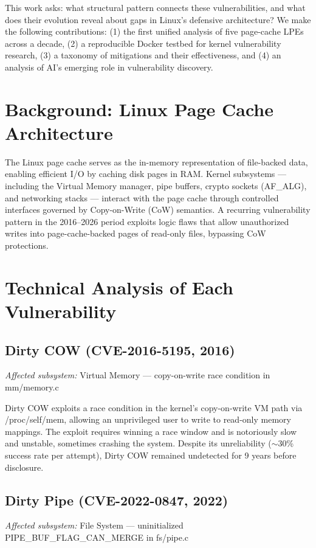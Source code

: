\documentclass[conference]{IEEEtran}
\begin{document}
This work asks: what structural pattern connects these vulnerabilities, and what does their evolution reveal about gaps in Linux's defensive architecture? We make the following contributions: (1) the first unified analysis of five page-cache LPEs across a decade, (2) a reproducible Docker testbed for kernel vulnerability research, (3) a taxonomy of mitigations and their effectiveness, and (4) an analysis of AI's emerging role in vulnerability discovery.

\section{Background: Linux Page Cache Architecture}
The Linux page cache serves as the in-memory representation of file-backed data, enabling efficient I/O by caching disk pages in RAM. Kernel subsystems --- including the Virtual Memory manager, pipe buffers, crypto sockets (AF\_ALG), and networking stacks --- interact with the page cache through controlled interfaces governed by Copy-on-Write (CoW) semantics. A recurring vulnerability pattern in the 2016--2026 period exploits logic flaws that allow unauthorized writes into page-cache-backed pages of read-only files, bypassing CoW protections.

\section{Technical Analysis of Each Vulnerability}

\subsection{Dirty COW (CVE-2016-5195, 2016)}
\textit{Affected subsystem:} Virtual Memory --- copy-on-write race condition in mm/memory.c

Dirty COW exploits a race condition in the kernel's copy-on-write VM path via /proc/self/mem, allowing an unprivileged user to write to read-only memory mappings. The exploit requires winning a race window and is notoriously slow and unstable, sometimes crashing the system. Despite its unreliability ($\sim$30\% success rate per attempt), Dirty COW remained undetected for 9 years before disclosure.

\subsection{Dirty Pipe (CVE-2022-0847, 2022)}
\textit{Affected subsystem:} File System --- uninitialized PIPE\_BUF\_FLAG\_CAN\_MERGE in fs/pipe.c
\end{document}
